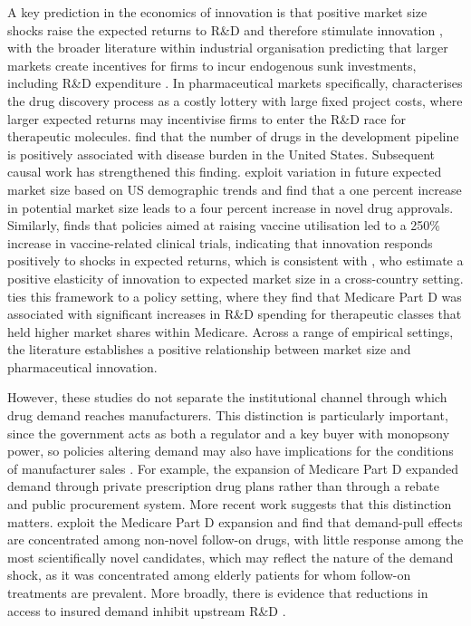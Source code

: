 \documentclass[12pt]{article}
\begin{document}
A key prediction in the economics of innovation is that positive market size shocks raise the expected returns to R\&D and therefore stimulate innovation \cite{dasgupta1980industrial}, with the broader literature within industrial organisation predicting that larger markets create incentives for firms to incur endogenous sunk investments, including R\&D expenditure \citep{sutton1991sunk, sutton1998technology}. In pharmaceutical markets specifically, \citet{sutton1998technology} characterises the drug discovery process as a costly lottery with large fixed project costs, where larger expected returns may incentivise firms to enter the R\&D race for therapeutic molecules. \citet{CivanAbdulkadir2006TDoP} find that the number of drugs in the development pipeline is positively associated with disease burden in the United States. Subsequent causal work has strengthened this finding. \citet{acemoglu2004market} exploit variation in future expected market size based on US demographic trends and find that a one percent increase in potential market size leads to a four percent increase in novel drug approvals. Similarly, \citet{finkelstein2004static} finds that policies aimed at raising vaccine utilisation led to a 250\% increase in vaccine-related  clinical trials, indicating that innovation responds positively to shocks in expected returns, which is consistent with \citet{dubois2015market}, who estimate a positive elasticity of innovation to expected market size in a cross-country setting. \citet{blume2013market} ties this framework to a policy setting, where they find that Medicare Part D was associated with significant increases in R\&D spending for therapeutic classes that held higher market shares within Medicare. Across a range of empirical settings, the literature establishes a positive relationship between market size and pharmaceutical innovation.

However, these studies do not separate the institutional channel through which drug demand reaches manufacturers. This distinction is particularly important, since the government acts as both a regulator and a key buyer with monopsony power, so policies  altering demand may also have implications for the conditions of manufacturer sales \citep{lakdawalla2018economics}. For example, the expansion of Medicare Part D expanded demand through private prescription drug plans rather than through a rebate and public procurement system. More recent work suggests that this distinction matters. \citet{dranove2022does} exploit the Medicare Part D expansion and find that demand-pull effects are concentrated among non-novel follow-on drugs, with little response among the most scientifically novel candidates, which may reflect the nature of the demand shock, as it was concentrated among elderly patients for whom follow-on treatments are prevalent. More broadly, there is evidence that reductions in access to insured demand inhibit upstream R\&D \citep{agha2022insurance}.
\end{document}

